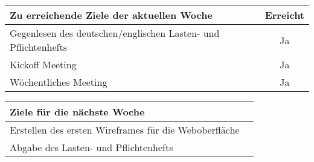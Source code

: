 \begin{tabularx}{\textwidth}{Xc}
    \arrayrulecolor{OliveGreen}
    \toprule
    {\bfseries Zu erreichende Ziele der aktuellen Woche} & {\bfseries Erreicht} \\
    \midrule[2pt]
    Gegenlesen des deutschen/englischen Lasten- und Pflichtenhefts   &Ja     \\
    \rowcolor{OliveGreen!15}
    Kickoff Meeting                                                  &Ja     \\
    \rowcolor{White}
    Wöchentliches Meeting                                            &Ja     \\
   \bottomrule[2pt]
\end{tabularx}
%
\vspace{1cm}
%
\begin{tabularx}{\textwidth}{Xc}
    \arrayrulecolor{OliveGreen}
    \toprule
    {\bfseries Ziele für die nächste Woche}                     &            \\
    \midrule[2pt]
    Erstellen des ersten Wireframes für die Weboberfläche       &            \\
    \rowcolor{OliveGreen!15}
    Abgabe des Lasten- und Pflichtenhefts                       &            \\
\end{tabularx}
